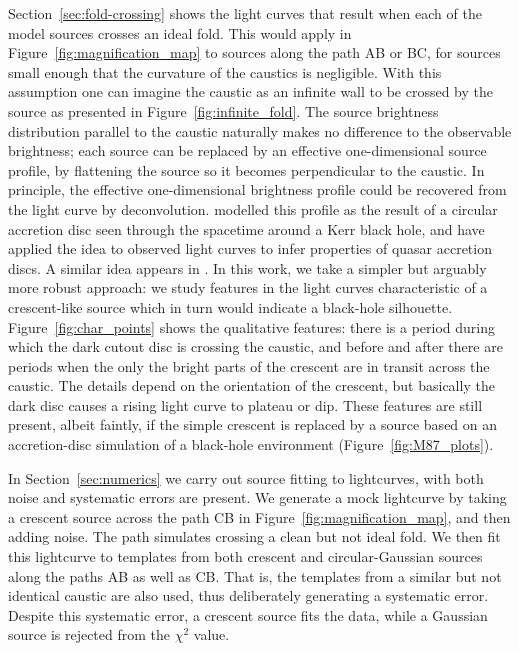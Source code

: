 \documentclass[usenatbib]{mn2e}
\begin{document}
Section~\ref{sec:fold-crossing} shows the light curves that result
when each of the model sources crosses an ideal fold.  This would
apply in Figure~\ref{fig:magnification_map} to sources along the path
AB or BC, for sources small enough that the curvature of the caustics
is negligible.  With this assumption one can imagine the caustic as an
infinite wall to be crossed by the source as presented in
Figure~\ref{fig:infinite_fold}.  The source brightness distribution
parallel to the caustic naturally makes no difference to the
observable brightness; each source can be replaced by an effective
one-dimensional source profile, by flattening the source so it becomes
perpendicular to the caustic.  In principle, the effective
one-dimensional brightness profile could be recovered from the light
curve by deconvolution.  \cite{1999ApJ...524...49A} modelled this
profile as the result of a circular accretion disc seen through the
spacetime around a Kerr black hole, and \cite{2012MNRAS.423..676A}
have applied the idea to observed light curves to infer properties of
quasar accretion discs.  A similar idea appears in
\cite{2013ApJ...769..131C}.  In this work, we take a simpler but
arguably more robust approach: we study features in the light curves
characteristic of a crescent-like source which in turn would indicate
a black-hole silhouette.  Figure~\ref{fig:char_points} shows the
qualitative features: there is a period during which the dark cutout
disc is crossing the caustic, and before and after there are periods
when the only the bright parts of the crescent are in transit across
the caustic.  The details depend on the orientation of the crescent,
but basically the dark disc causes a rising light curve to plateau or
dip.  These features are still present, albeit faintly, if the simple
crescent is replaced by a source based on an accretion-disc simulation
of a black-hole environment (Figure~\ref{fig:M87_plots}).

In Section~\ref{sec:numerics} we carry out source fitting to
lightcurves, with both noise and systematic errors are present.  We
generate a mock lightcurve by taking a crescent source across the path
CB in Figure~\ref{fig:magnification_map}, and then adding noise.  The
path simulates crossing a clean but not ideal fold.  We then fit this
lightcurve to templates from both crescent and circular-Gaussian
sources along the paths AB as well as CB.  That is, the templates from
a similar but not identical caustic are also used, thus deliberately
generating a systematic error.  Despite this systematic error, a
crescent source fits the data, while a Gaussian source is rejected
from the $\chi^2$ value.
\end{document}
